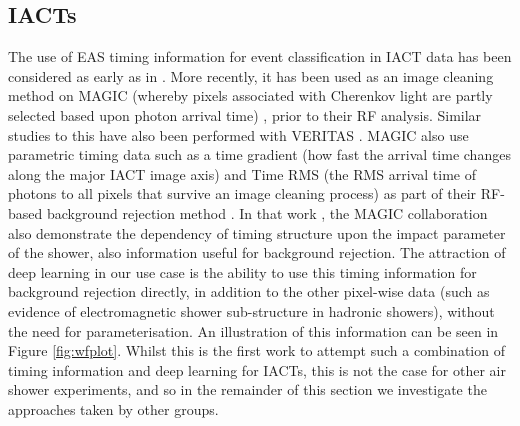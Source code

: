 \subsection{IACTs}
The use of EAS timing information for event classification in IACT data has been considered as early as in \cite{paulathesis}. More recently, it has been used as an image cleaning method on MAGIC (whereby pixels associated with Cherenkov light are partly selected based upon photon arrival time) \cite{magictime}, prior to their RF analysis. Similar studies to this have also been performed with VERITAS \cite{jamietime}. MAGIC also use parametric timing data such as a time gradient (how fast the arrival time changes along the major IACT image axis) and Time RMS (the RMS arrival time of photons to all pixels that survive an image cleaning process) as part of their RF-based background rejection method \cite{supermagictime}. In that work \cite{supermagictime}, the MAGIC collaboration also demonstrate the dependency of timing structure upon the impact parameter of the shower, also information useful for background rejection. The attraction of deep learning in our use case is the ability to use this timing information for background rejection directly, in addition to the other pixel-wise data (such as evidence of electromagnetic shower sub-structure in hadronic showers), without the need for parameterisation. An illustration of this information can be seen in Figure \ref{fig:wfplot}. Whilst this is the first work to attempt such a combination of timing information and deep learning for IACTs, this is not the case for other air shower experiments, and so in the remainder of this section we investigate the approaches taken by other groups.
